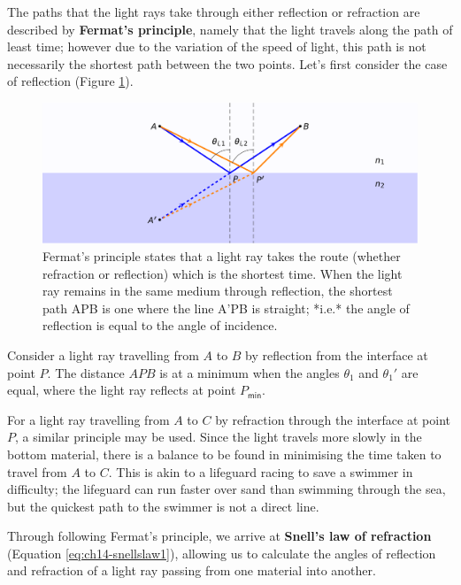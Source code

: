 \documentclass[
]{book}
\begin{document}
The paths that the light rays take through either reflection or refraction are described by \textbf{Fermat's principle}, namely that the light travels along the path of least time; however due to the variation of the speed of light, this path is not necessarily the shortest path between the two points. Let's first consider the case of reflection (Figure \ref{fig:ch14-fermatsprinciple}).

\begin{figure}

{\centering \includegraphics[width=0.7\linewidth]{visualisations/LaTeX/ch14-fermatsprinciple1} 

}

\caption{Fermat's principle states that a light ray takes the route (whether refraction or reflection) which is the shortest time. When the light ray remains in the same medium through reflection, the shortest path APB is one where the line A'PB is straight; *i.e.* the angle of reflection is equal to the angle of incidence.}\label{fig:ch14-fermatsprinciple}
\end{figure}

Consider a light ray travelling from \(A\) to \(B\) by reflection from the interface at point \(P\). The distance \(APB\) is at a minimum when the angles \(\theta_1\) and \(\theta_1'\) are equal, where the light ray reflects at point \(P_{\textsf{min}}\).

For a light ray travelling from \(A\) to \(C\) by refraction through the interface at point \(P\), a similar principle may be used. Since the light travels more slowly in the bottom material, there is a balance to be found in minimising the time taken to travel from \(A\) to \(C\). This is akin to a lifeguard racing to save a swimmer in difficulty; the lifeguard can run faster over sand than swimming through the sea, but the quickest path to the swimmer is not a direct line.

Through following Fermat's principle, we arrive at \textbf{Snell's law of refraction} (Equation \eqref{eq:ch14-snellslaw1}), allowing us to calculate the angles of reflection and refraction of a light ray passing from one material into another.
\end{document}
